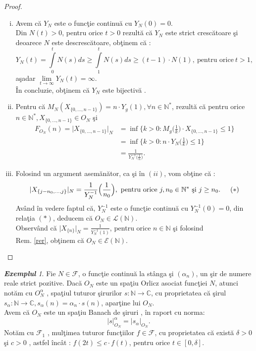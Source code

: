 \documentclass[ a4paper, 12pt]{report}
\theoremstyle{definition}
\theoremstyle{remark}
\newtheorem{exemple}{\bf Exemplul}[section]
\numberwithin{equation}{section}
\begin{document}
\begin{proof}
\begin{enumerate}[(i)]
\item Avem c\u a $Y_N$ este o func\c tie continu\u a cu $Y_N(0) = 0$.\\
Din $N(t) > 0$, pentru orice $t >0$ rezult\u a c\u a $Y_N$ este strict cresc\u atoare \c si deoarece $N$ este descresc\u atoare, ob\c tinem c\u a :
\[Y_N(t)  = \int\limits_{0}^{t} N(s) ds \geq \int\limits_{1}^{t} N(s) ds \geq (t-1) \cdot N(1),\ \mbox{pentru orice}\  t > 1,\]
 a\c sadar $\lim\limits_{t \rightarrow \infty} Y_N(t) = \infty.$\\
\^In concluzie, ob\c tinem c\u a $Y_N$ este bijectiv\u a .
\item Pentru c\u a $M_N(X_{\{0, \ldots, n-1\}}) = n \cdot Y_g(1), \forall n \in \mathbb{N}^{\ast}$, rezult\u a c\u a pentru orice $n \in \mathbb{N}^{\ast}, X_{\{0, \ldots, n-1\}} \in O_N$ \c si
\begin{align*}
F_{O_{N}}(n) = \lvert X_{\{0,\ldots, n-1\}}\rvert_{N} &= \inf\Big\{k >0 : M_g\Big(\frac{1}{k}\Big) \cdot X_{\{0, \ldots, n-1\}}\leq 1 \Big\}\\
 &= \inf \Big\{ k>0 : n \cdot Y_N\Big(\frac{1}{k}\Big) \leq 1 \Big\}\\
  &= \frac{1}{Y_N^{-1}\Big(\frac{1}{n}\Big)}.
\end{align*}
\item Folosind un argument asem\u an\u ator, ca \c si \^in $(ii)$, vom ob\c tine c\u a :
\[ \lvert X_{\{ j-n_0, \ldots , j \}} \rvert_{N} =\frac{1}{Y_N^{-1}}\Big(\frac{1}{n_0}\Big),\ \mbox{pentru orice}\  j,n_0 \in \mathbb{N}^{\ast}\ \mbox{\c si}\ j \geq n_0. \hspace{5mm} (\ast)\]
Av\^and \^in vedere faptul c\u a, $Y_N^{-1}$ este o func\c tie continu\u a cu $Y_N^{-1}(0) = 0$, din rela\c tia $(\ast)$, deducem c\u a $O_N \in \mathcal{L}(\mathbb{N}).$\\
Observ\^and c\u a $\lvert X_{\{ n \}} \rvert_{N} = \frac{1}{Y_N^{-1}(1)}$, pentru orice $n \in \mathbb{N}$ \c si folosind \\Rem. \ref{rer}, ob\c tinem c\u a $O_N \in \mathcal{E}(\mathbb{N}).$\\
\end{enumerate}
\end{proof}
\begin{exemple}
Fie $N \in \mathcal{F}$, o func\c tie continu\u a la st\^anga \c si $(\alpha_n)$, un \c sir de numere reale strict pozitive. Dac\u a $O_N$ este un spa\c tiu Orlicz asociat func\c tiei $N$, atunci not\u am cu $O_N^{\alpha}$ , spa\c tiul tuturor \c sirurilor $s : \mathbb{N} \rightarrow \mathbb{C}$, cu proprietatea c\u a \c sirul $s_{\alpha} : \mathbb{N} \rightarrow \mathbb{C}, s_{\alpha}(n) = \alpha_n \cdot s(n)$, apar\c tine lui $O_N.$\\
Avem c\u a $O_N$ este un spa\c tiu Banach de \c siruri , \^in raport cu norma:
\[\lvert s \rvert_{O_{N}}^{\alpha} = \lvert s_{\alpha}\rvert_{O_{N}}.\]
Not\u am cu $\mathcal{F}_{1}$ , mul\c timea tuturor func\c tiilor $f \in \mathcal{F}$, cu proprietatea c\u a exist\u a $\delta > 0$ \c si $c>0$ , astfel \^inc\^at : $f(2t) \leq c \cdot f(t)$, pentru orice $t \in [0,\delta].$
\end{exemple}
\end{document}
